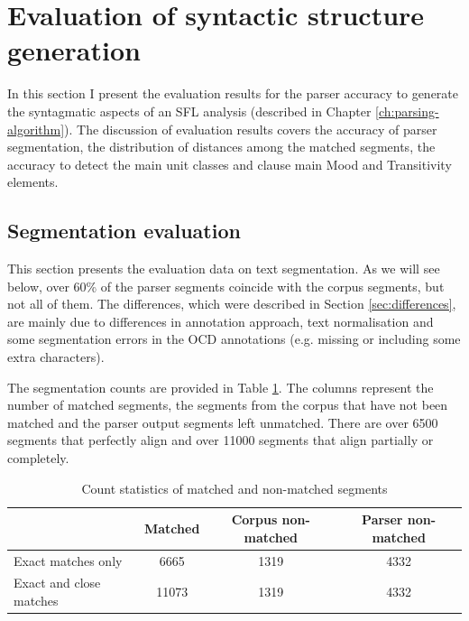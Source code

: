 \section{Evaluation of syntactic structure generation}
\label{sec:syntactic-evaluation}
    
    In this section I present the evaluation results for the parser accuracy to generate the syntagmatic aspects of an SFL analysis (described in Chapter \ref{ch:parsing-algorithm}). The discussion of evaluation results covers the accuracy of parser segmentation, the distribution of distances among the matched segments, the accuracy to detect the main unit classes and clause main Mood and Transitivity elements. 
    
\subsection{Segmentation evaluation}
\label{sec:segmentation-evaluation}
    
    This section presents the evaluation data on text segmentation. As we will see below, over 60\% of the parser segments coincide with the corpus segments, but not all of them. The differences, which were described in Section \ref{sec:differences}, are mainly due to differences in annotation approach, text normalisation and some segmentation errors in the OCD annotations (e.g. missing or including some extra characters). 
    
    The segmentation counts are provided in Table \ref{tab:segmentation-stats}. The columns represent  the number of matched segments, the segments from the corpus that have not been matched and the parser output segments left unmatched. There are over 6500 segments that perfectly align and over 11000 segments that align partially or completely. %
    
    \begin{table}[!ht]
    \centering
    \begin{tabular}{lccc}
    \toprule
    {} &  Matched &  Corpus non-matched &  Parser non-matched \\
    \midrule
    Exact matches only &     6665 &                1319 &                4332 \\
    Exact and close matches &    11073 &                1319 &                4332 \\
    \bottomrule
    \end{tabular}
    \caption{Count statistics of matched and non-matched segments}
    \label{tab:segmentation-stats}
    \end{table}
    

